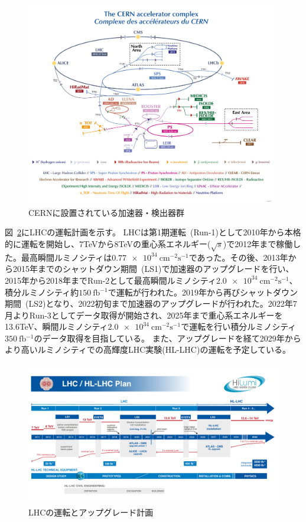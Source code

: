 \begin{figure}[H]
  \centering
  \includegraphics[clip, width=11cm]{fig/2/accel_complex-v2022_complex.png}
  \caption{CERNに設置されている加速器・検出器群\cite{article:accelerator-complex}}
  \label{fig:2-2}
\end{figure}


図~\ref{fig:2-3}にLHCの運転計画を示す。
LHCは第1期運転~(Run-1)として2010年から本格的に運転を開始し、7TeVから8TeVの重心系エネルギー($\sqrt{s}$)で2012年まで稼働した。最高瞬間ルミノシティは$\SI{0.77e34}{\cm^{-2}\s^{-1}}$であった。その後、2013年から2015年までのシャットダウン期間~(LS1)で加速器のアップグレードを行い、2015年から2018年までRun-2として最高瞬間ルミノシティ$\SI{2.0e34}{\cm^{-2}\s^{-1}}$、積分ルミノシティ約$\SI{150}{\femto\barn^{-1}}$で運転が行われた。2019年から再びシャットダウン期間~(LS2)となり、2022初旬まで加速器のアップグレードが行われた。2022年7月よりRun-3としてデータ取得が開始され、2025年まで重心系エネルギーを13.6TeV、瞬間ルミノシティ$\SI{2.0e34}{\cm^{-2}\s^{-1}}$で運転を行い積分ルミノシティ$\SI{350}{\femto\barn^{-1}}$のデータ取得を目指している。
また、アップグレードを経て2029年からより高いルミノシティでの高輝度LHC実験(HL-LHC)の運転を予定している。

\begin{figure}[H]
  \centering
  \includegraphics[clip, width=14cm]{fig/2/HL-LHC_Janvier2022.pdf}
  \caption{LHCの運転とアップグレード計画\cite{article:LHCDesignReport}}
  \label{fig:2-3}
\end{figure}



